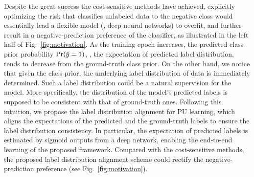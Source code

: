 \documentclass[final]{cvpr}
\newcommand{\bangyan}[1]{#1}
\newcommand{\yunrui}[1]{#1}
\begin{document}
\bangyan{Despite the great success the cost-sensitive methods have achieved, explicitly optimizing the risk that classifies unlabeled data to the negative class would essentially lead a flexible model (\eg, deep neural networks) to overfit, and further result in a negative-prediction preference of the classifier, as illustrated in the left half of Fig.~\ref{fig:motivation}. As the training epoch increases, the predicted class prior probability ${\rm Pr}(\hat{y}=1)$, \ie, the expectation of predicted label distribution, tends to decrease from the ground-truth class prior.} \bangyan{On the other hand, we notice that given the class prior, the underlying label distribution of data is immediately determined. Such a label distribution could be a natural supervision for the model. More specifically,} \yunrui{the distribution of the model's predicted labels is supposed to be consistent with that of ground-truth ones. Following this intuition, we propose the label distribution alignment for PU learning, which aligns the expectations of the predicted and the ground-truth labels to ensure the label distribution consistency.} In particular, the expectation of predicted labels is estimated by sigmoid outputs from a deep network, \bangyan{enabling the end-to-end learning of the proposed framework. Compared with the cost-sensitive methods, the proposed label distribution alignment scheme could rectify the negative-prediction preference (see Fig.~\ref{fig:motivation}).} 
\end{document}
